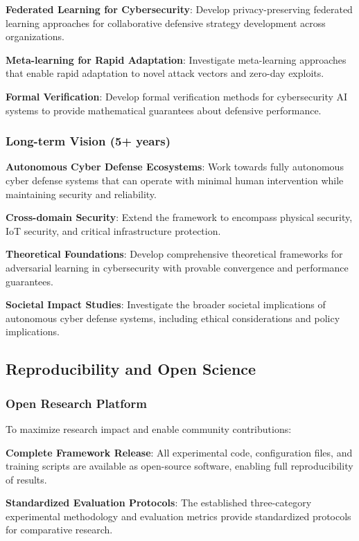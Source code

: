 \documentclass[12pt,oneside,a4paper]{article}
\theoremstyle{definition}
\theoremstyle{plain}
\begin{document}
\textbf{Federated Learning for Cybersecurity}: Develop privacy-preserving federated learning approaches for collaborative defensive strategy development across organizations.

\textbf{Meta-learning for Rapid Adaptation}: Investigate meta-learning approaches that enable rapid adaptation to novel attack vectors and zero-day exploits.

\textbf{Formal Verification}: Develop formal verification methods for cybersecurity AI systems to provide mathematical guarantees about defensive performance.

\subsubsection{Long-term Vision (5+ years)}

\textbf{Autonomous Cyber Defense Ecosystems}: Work towards fully autonomous cyber defense systems that can operate with minimal human intervention while maintaining security and reliability.

\textbf{Cross-domain Security}: Extend the framework to encompass physical security, IoT security, and critical infrastructure protection.

\textbf{Theoretical Foundations}: Develop comprehensive theoretical frameworks for adversarial learning in cybersecurity with provable convergence and performance guarantees.

\textbf{Societal Impact Studies}: Investigate the broader societal implications of autonomous cyber defense systems, including ethical considerations and policy implications.

\subsection{Reproducibility and Open Science}

\subsubsection{Open Research Platform}
To maximize research impact and enable community contributions:

\textbf{Complete Framework Release}: All experimental code, configuration files, and training scripts are available as open-source software, enabling full reproducibility of results.

\textbf{Standardized Evaluation Protocols}: The established three-category experimental methodology and evaluation metrics provide standardized protocols for comparative research.
\end{document}
